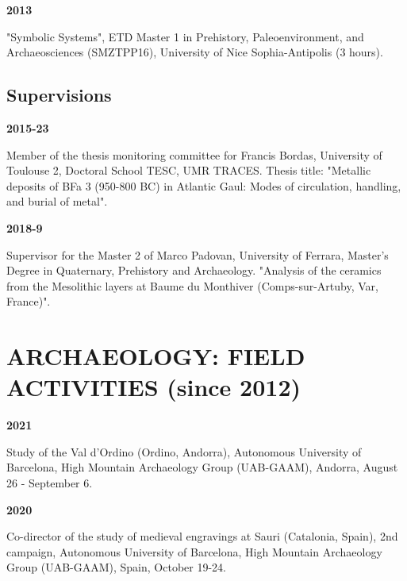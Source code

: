 \documentclass{article}
\newcommand{\fr}[1]{} %
\newcommand{\en}[1]{#1}   %
\begin{document}
{\smallbreak
\textbf{2013}
\fr{"Systèmes symboliques", ETD Master 1 Préhistoire, Paléoenvironnement et Archéosciences (SMZTPP16), Université Nice Sophia-Antipolis (3 heures).}
\en{"Symbolic Systems", ETD Master 1 in Prehistory, Paleoenvironment, and Archaeosciences (SMZTPP16), University of Nice Sophia-Antipolis (3 hours).}

\subsection*{\fr{Encadrements}\en{Supervisions}}

\textbf{2015-23}
\fr{Membre du comité de suivi de la thèse de Francis Bordas, Université Toulouse 2, École doctorale TESC, UMR TRACES. Titre de la thèse : "Les dépôts métalliques du BFa 3 (950-800 av. J.-C.) en Gaule atlantique Modalités de circulation, de manipulation et d’enfouissement du métal".}
\en{Member of the thesis monitoring committee for Francis Bordas, University of Toulouse 2, Doctoral School TESC, UMR TRACES. Thesis title: "Metallic deposits of BFa 3 (950-800 BC) in Atlantic Gaul: Modes of circulation, handling, and burial of metal".}

\smallbreak
\textbf{2018-9}
\fr{Tuteur du Master 2 de Marco Padovan, Università degli Studi di Ferrara, Corso di Laurea Magistrale in Quaternario, Preistoria e Archeologia. "Analyse de la céramique des couches mésolithiques à Baume du Monthiver (Comps-sur-Artuby, Var, France)".}
\en{Supervisor for the Master 2 of Marco Padovan, University of Ferrara, Master's Degree in Quaternary, Prehistory and Archaeology. "Analysis of the ceramics from the Mesolithic layers at Baume du Monthiver (Comps-sur-Artuby, Var, France)".}

\section*{\fr{ARCHÉOLOGIE: ACTIVITÉS DE TERRAIN (depuis 2012)}\en{ARCHAEOLOGY: FIELD ACTIVITIES (since 2012)}}

\textbf{2021}
\fr{Étude du Val d'Ordino (Ordino, Andorre), Universitat Autònoma de Barcelona, Grup d'Arqueologia de l'Alta Muntanya (UAB-GAAM), Andorre, 26 août-6 septembre.}
\en{Study of the Val d'Ordino (Ordino, Andorra), Autonomous University of Barcelona, High Mountain Archaeology Group (UAB-GAAM), Andorra, August 26 - September 6.}

\smallbreak
\textbf{2020}
\fr{Co-responsable de l'étude des gravures médiévales de Sauri (Catalogne, Espagne), 2ème campagne, Universitat Autònoma de Barcelona, Grup d'Arqueologia de l'Alta Muntanya (UAB-GAAM), Espagne, 19 octobre-24 octobre.}
\en{Co-director of the study of medieval engravings at Sauri (Catalonia, Spain), 2nd campaign, Autonomous University of Barcelona, High Mountain Archaeology Group (UAB-GAAM), Spain, October 19-24.}

}
\end{document}
